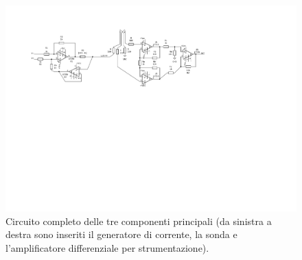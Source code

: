 \documentclass[fleqn,varvw,preprintnumbers,citeautoscript]{memo}
\begin{document}
\begin{turnpage}
    \begin{figure}[p]
        \centering
        \includegraphics[width=\linewidth,trim={2.5cm 12.5cm 8cm 2cm},clip]{SCHEMA_full1.pdf}
        \caption{Circuito completo delle tre componenti principali (da sinistra a destra sono inseriti il generatore di corrente, la sonda e l'amplificatore differenziale per strumentazione).}\label{fig:circuit_memo2}
    \end{figure}
\end{turnpage}
\end{document}
